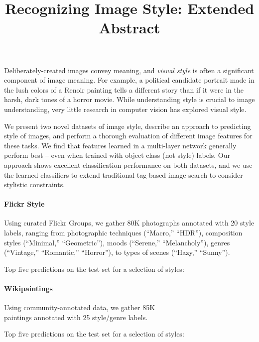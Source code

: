 \documentclass[extendedabs]{bmvc2k}
\title{Recognizing Image Style: Extended Abstract}
\begin{document}
\maketitle

\noindent
Deliberately-created images convey meaning, and \textit{visual style} is often a significant component of image meaning.
For example, a political candidate portrait made in the lush colors of a Renoir painting tells a different story than if it were in the harsh, dark tones of a horror movie.
While understanding style is crucial to image understanding, very little research in computer vision has explored visual style.

We present two novel datasets of image style, describe an approach to predicting style of images, and perform a thorough evaluation of different image features for these tasks.
We find that features learned in a multi-layer network generally perform best -- even when trained with object class (not style) labels.
Our approach shows excellent classification performance on both datasets, and we use the learned classifiers to extend traditional tag-based image search to consider stylistic constraints.

\newcommand{\wid}{.7in}
\newcommand{\fgap}{.57in}
\newcommand{\dgap}{.42in}

\paragraph{Flickr Style}
Using curated Flickr Groups, we gather 80K photographs annotated with 20 style labels, ranging from photographic techniques  (``Macro,'' ``HDR''), composition styles (``Minimal,'' ``Geometric''), moods (``Serene,'' ``Melancholy''), genres (``Vintage,'' ``Romantic,'' ``Horror''), to types of scenes (``Hazy,'' ``Sunny'').

Top five predictions on the test set for a selection of styles:

\vspace{.666em}

\paragraph{Wikipaintings}
Using community-annotated data, we gather 85K\\
paintings annotated with 25 style/genre labels.

Top five predictions on the test set for a selection of styles:
\end{document}
